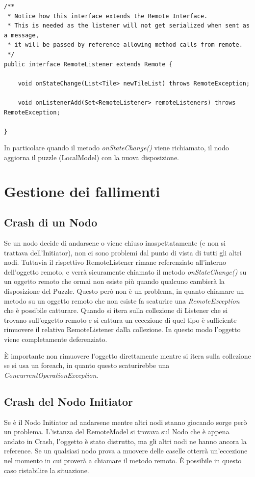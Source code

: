 \begin{verbatim}
/**
 * Notice how this interface extends the Remote Interface.
 * This is needed as the listener will not get serialized when sent as a message,
 * it will be passed by reference allowing method calls from remote.
 */
public interface RemoteListener extends Remote {

    void onStateChange(List<Tile> newTileList) throws RemoteException;

    void onListenerAdd(Set<RemoteListener> remoteListeners) throws RemoteException;

}
\end{verbatim}
In particolare quando il metodo \textit{onStateChange()} viene richiamato, il nodo aggiorna il puzzle (LocalModel) con la nuova disposizione.
\section{Gestione dei fallimenti}
\subsection{Crash di un Nodo}
Se un nodo decide di andarsene o viene chiuso inaspettatamente (e non si trattava dell'Initiator), non ci sono problemi dal punto di vista di tutti gli altri nodi. Tuttavia il rispettivo RemoteListener rimane referenziato all'interno dell'oggetto remoto, e verrà sicuramente chiamato il metodo \textit{onStateChange()} su un oggetto remoto che ormai non esiste più quando qualcuno cambierà la disposizione del Puzzle.\newline
Questo però non è un problema, in quanto chiamare un metodo su un oggetto remoto che non esiste fa scaturire una \textit{RemoteException} che è possibile catturare.\newline
Quando si itera sulla collezione di Listener che si trovano sull'oggetto remoto e si cattura un eccezione di quel tipo è sufficiente rimuovere il relativo RemoteListener dalla collezione. In questo modo l'oggetto viene completamente deferenziato.
\begin{warn}[ATTENZIONE:]
    È importante non rimuovere l'oggetto direttamente mentre si itera sulla collezione se si usa un foreach, in quanto questo scaturirebbe una \textit{ConcurrentOperationException}.
\end{warn}
\subsection{Crash del Nodo Initiator}
Se è il Nodo Initiator ad andarsene mentre altri nodi stanno giocando sorge però un problema. L'istanza del RemoteModel si trovava sul Nodo che è appena andato in Crash, l'oggetto è stato distrutto, ma gli altri nodi ne hanno ancora la reference. Se un qualsiasi nodo prova a muovere delle caselle otterrà un'eccezione nel momento in cui proverà a chiamare il metodo remoto.\newline
È possibile in questo caso ristabilire la situazione.
